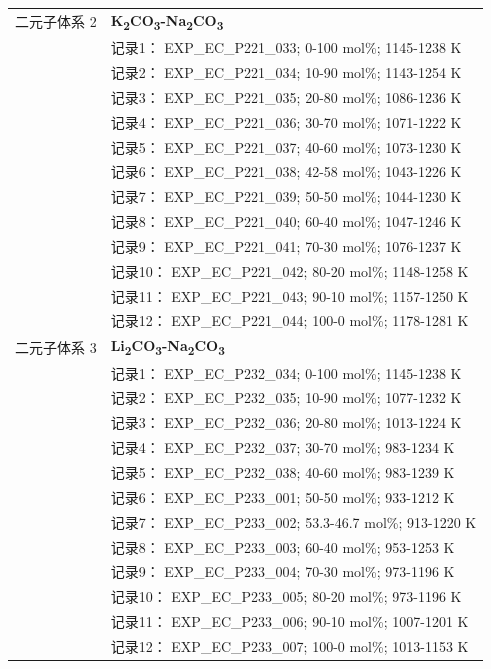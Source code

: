 \documentclass[12pt]{article}
\begin{document}
{\begin{longtable}[]{@{}
  >{\raggedright\arraybackslash}p{}
  >{\raggedright\arraybackslash}p{}@{}}
二元子体系 2  & \textbf{K\textsubscript{2}CO\textsubscript{3}-Na\textsubscript{2}CO\textsubscript{3}} \\
 & 记录1： EXP\_EC\_P221\_033; 0-100 mol\%; 1145-1238 K \\
 & 记录2： EXP\_EC\_P221\_034; 10-90 mol\%; 1143-1254 K \\
 & 记录3： EXP\_EC\_P221\_035; 20-80 mol\%; 1086-1236 K \\
 & 记录4： EXP\_EC\_P221\_036; 30-70 mol\%; 1071-1222 K \\
 & 记录5： EXP\_EC\_P221\_037; 40-60 mol\%; 1073-1230 K \\
 & 记录6： EXP\_EC\_P221\_038; 42-58 mol\%; 1043-1226 K \\
 & 记录7： EXP\_EC\_P221\_039; 50-50 mol\%; 1044-1230 K \\
 & 记录8： EXP\_EC\_P221\_040; 60-40 mol\%; 1047-1246 K \\
 & 记录9： EXP\_EC\_P221\_041; 70-30 mol\%; 1076-1237 K \\
 & 记录10： EXP\_EC\_P221\_042; 80-20 mol\%; 1148-1258 K \\
 & 记录11： EXP\_EC\_P221\_043; 90-10 mol\%; 1157-1250 K \\
 & 记录12： EXP\_EC\_P221\_044; 100-0 mol\%; 1178-1281 K  \\

二元子体系 3  & \textbf{Li\textsubscript{2}CO\textsubscript{3}-Na\textsubscript{2}CO\textsubscript{3}} \\
 & 记录1： EXP\_EC\_P232\_034; 0-100 mol\%; 1145-1238 K \\
 & 记录2： EXP\_EC\_P232\_035; 10-90 mol\%; 1077-1232 K \\
 & 记录3： EXP\_EC\_P232\_036; 20-80 mol\%; 1013-1224 K \\
 & 记录4： EXP\_EC\_P232\_037; 30-70 mol\%; 983-1234 K \\
 & 记录5： EXP\_EC\_P232\_038; 40-60 mol\%; 983-1239 K \\
 & 记录6： EXP\_EC\_P233\_001; 50-50 mol\%; 933-1212 K \\
 & 记录7： EXP\_EC\_P233\_002; 53.3-46.7 mol\%; 913-1220 K \\
 & 记录8： EXP\_EC\_P233\_003; 60-40 mol\%; 953-1253 K \\
 & 记录9： EXP\_EC\_P233\_004; 70-30 mol\%; 973-1196 K \\
 & 记录10： EXP\_EC\_P233\_005; 80-20 mol\%; 973-1196 K \\
 & 记录11： EXP\_EC\_P233\_006; 90-10 mol\%; 1007-1201 K \\
 & 记录12： EXP\_EC\_P233\_007; 100-0 mol\%; 1013-1153 K  \\


\end{longtable}}
\end{document}
